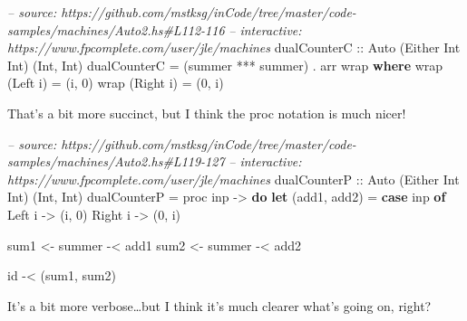 \documentclass[]{article}
\newenvironment{Shaded}{}{}
\newcommand{\KeywordTok}[1]{\textcolor[rgb]{0.00,0.44,0.13}{\textbf{{#1}}}}
\newcommand{\DataTypeTok}[1]{\textcolor[rgb]{0.56,0.13,0.00}{{#1}}}
\newcommand{\DecValTok}[1]{\textcolor[rgb]{0.25,0.63,0.44}{{#1}}}
\newcommand{\CommentTok}[1]{\textcolor[rgb]{0.38,0.63,0.69}{\textit{{#1}}}}
\newcommand{\OtherTok}[1]{\textcolor[rgb]{0.00,0.44,0.13}{{#1}}}
\newcommand{\FunctionTok}[1]{\textcolor[rgb]{0.02,0.16,0.49}{{#1}}}
\newcommand{\NormalTok}[1]{{#1}}
\begin{document}
\begin{Shaded}
\begin{Highlighting}[]
\CommentTok{-- source: https://github.com/mstksg/inCode/tree/master/code-samples/machines/Auto2.hs#L112-116}
\CommentTok{-- interactive: https://www.fpcomplete.com/user/jle/machines}
\OtherTok{dualCounterC ::} \DataTypeTok{Auto} \NormalTok{(}\DataTypeTok{Either} \DataTypeTok{Int} \DataTypeTok{Int}\NormalTok{) (}\DataTypeTok{Int}\NormalTok{, }\DataTypeTok{Int}\NormalTok{)}
\NormalTok{dualCounterC }\FunctionTok{=} \NormalTok{(summer }\FunctionTok{***} \NormalTok{summer) }\FunctionTok{.} \NormalTok{arr wrap}
  \KeywordTok{where}
    \NormalTok{wrap (}\DataTypeTok{Left} \NormalTok{i)  }\FunctionTok{=} \NormalTok{(i, }\DecValTok{0}\NormalTok{)}
    \NormalTok{wrap (}\DataTypeTok{Right} \NormalTok{i) }\FunctionTok{=} \NormalTok{(}\DecValTok{0}\NormalTok{, i)}
\end{Highlighting}
\end{Shaded}

That's a bit more succinct, but I think the proc notation is much nicer!

\begin{Shaded}
\begin{Highlighting}[]
\CommentTok{-- source: https://github.com/mstksg/inCode/tree/master/code-samples/machines/Auto2.hs#L119-127}
\CommentTok{-- interactive: https://www.fpcomplete.com/user/jle/machines}
\OtherTok{dualCounterP ::} \DataTypeTok{Auto} \NormalTok{(}\DataTypeTok{Either} \DataTypeTok{Int} \DataTypeTok{Int}\NormalTok{) (}\DataTypeTok{Int}\NormalTok{, }\DataTypeTok{Int}\NormalTok{)}
\NormalTok{dualCounterP }\FunctionTok{=} \NormalTok{proc inp }\OtherTok{->} \KeywordTok{do}
    \KeywordTok{let} \NormalTok{(add1, add2) }\FunctionTok{=} \KeywordTok{case} \NormalTok{inp }\KeywordTok{of} \DataTypeTok{Left} \NormalTok{i  }\OtherTok{->} \NormalTok{(i, }\DecValTok{0}\NormalTok{)}
                                   \DataTypeTok{Right} \NormalTok{i }\OtherTok{->} \NormalTok{(}\DecValTok{0}\NormalTok{, i)}

    \NormalTok{sum1 }\OtherTok{<-} \NormalTok{summer }\FunctionTok{-<} \NormalTok{add1}
    \NormalTok{sum2 }\OtherTok{<-} \NormalTok{summer }\FunctionTok{-<} \NormalTok{add2}

    \NormalTok{id }\FunctionTok{-<} \NormalTok{(sum1, sum2)}
\end{Highlighting}
\end{Shaded}

It's a bit more verbose\ldots{}but I think it's much clearer what's going on,
right?
\end{document}

